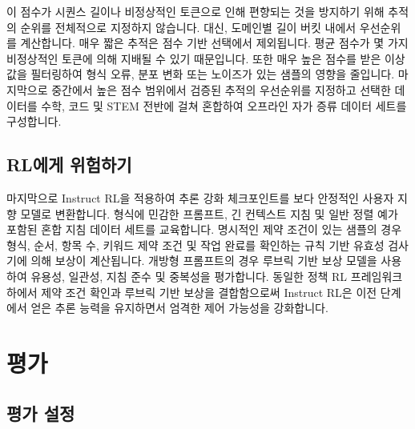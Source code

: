 \documentclass{article}
\begin{document}
이 점수가 시퀀스 길이나 비정상적인 토큰으로 인해 편향되는 것을 방지하기 위해 추적의 순위를 전체적으로 지정하지 않습니다. 대신, 도메인별 길이 버킷 내에서 우선순위를 계산합니다. 매우 짧은 추적은 점수 기반 선택에서 제외됩니다. 평균 점수가 몇 가지 비정상적인 토큰에 의해 지배될 수 있기 때문입니다. 또한 매우 높은 점수를 받은 이상값을 필터링하여 형식 오류, 분포 변화 또는 노이즈가 있는 샘플의 영향을 줄입니다. 마지막으로 중간에서 높은 점수 범위에서 검증된 추적의 우선순위를 지정하고 선택한 데이터를 수학, 코드 및 STEM 전반에 걸쳐 혼합하여 오프라인 자가 증류 데이터 세트를 구성합니다.

\subsection{RL에게 위험하기}

마지막으로 Instruct RL을 적용하여 추론 강화 체크포인트를 보다 안정적인 사용자 지향 모델로 변환합니다. 형식에 민감한 프롬프트, 긴 컨텍스트 지침 및 일반 정렬 예가 포함된 혼합 지침 데이터 세트를 교육합니다. 명시적인 제약 조건이 있는 샘플의 경우 형식, 순서, 항목 수, 키워드 제약 조건 및 작업 완료를 확인하는 규칙 기반 유효성 검사기에 의해 보상이 계산됩니다. 개방형 프롬프트의 경우 루브릭 기반 보상 모델을 사용하여 유용성, 일관성, 지침 준수 및 중복성을 평가합니다. 동일한 정책 RL 프레임워크 하에서 제약 조건 확인과 루브릭 기반 보상을 결합함으로써 Instruct RL은 이전 단계에서 얻은 추론 능력을 유지하면서 엄격한 제어 가능성을 강화합니다.






\section{평가}
\subsection{평가 설정}
\end{document}

